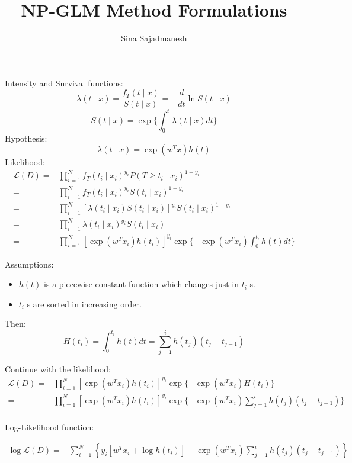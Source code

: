 \documentclass[]{article}
\title{NP-GLM Method Formulations}
\author{Sina Sajadmanesh}
\begin{document}
\maketitle

Intensity and Survival functions:
\[\lambda(t\mid x)=\frac{f_T(t\mid x)}{S(t\mid x)}=-\frac{d}{dt}\ln S(t\mid x) \]
\[S(t\mid x)=\exp\{\int_{0}^{t}\lambda(t\mid x)dt\}\]
Hypothesis: 
\[\lambda(t\mid x)=\exp(w^Tx)h(t)\]
Likelihood:
\begin{equation*}
\begin{split}
\mathcal{L}(D)=&\prod_{i=1}^{N}f_T(t_i\mid x_i)^{y_i}P(T\ge t_i\mid x_i)^{1-y_i}\\
=&\prod_{i=1}^{N}f_T(t_i\mid x_i)^{y_i}S(t_i\mid x_i)^{1-y_i}\\
=&\prod_{i=1}^{N}[\lambda(t_i\mid x_i)S(t_i\mid x_i)]^{y_i}S(t_i\mid x_i)^{1-y_i}\\
=&\prod_{i=1}^{N}\lambda(t_i\mid x_i)^{y_i}S(t_i\mid x_i)\\
=&\prod_{i=1}^{N}\left[\exp(w^Tx_i)h(t_i)\right]^{y_i}\exp\lbrace-\exp(w^Tx_i)\int_{0}^{t_i}h(t)dt\rbrace
\end{split}
\end{equation*}

Assumptions:
\begin{itemize}
\item $h(t)$ is a piecewise constant function which changes just in $t_i$ s.
\item $t_i$ s are sorted in increasing order.
\end{itemize}

Then:
\[H(t_i)=\int_{0}^{t_i}h(t)dt = \sum_{j=1}^{i}h(t_j)(t_j-t_{j-1})\]

Continue with the likelihood:
\begin{equation*}
\begin{split}
\mathcal{L}(D)
=&\prod_{i=1}^{N}\left[\exp(w^Tx_i)h(t_i)\right]^{y_i}\exp\lbrace-\exp(w^Tx_i)H(t_i)\rbrace\\
=&\prod_{i=1}^{N}\left[\exp(w^Tx_i)h(t_i)\right]^{y_i}\exp\lbrace-\exp(w^Tx_i)\sum_{j=1}^{i}h(t_j)(t_j-t_{j-1})\rbrace\\
\end{split}
\end{equation*}

Log-Likelihood function:

\begin{equation*}
\begin{split}
\log\mathcal{L}(D)
=&\sum_{i=1}^{N}\left\lbrace y_i\left[w^Tx_i + \log h(t_i)\right]-\exp(w^Tx_i)\sum_{j=1}^{i}h(t_j)(t_j-t_{j-1})\right\rbrace\\
\end{split}
\end{equation*}
\end{document}
